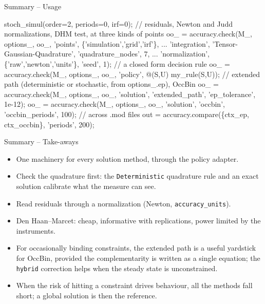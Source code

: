 \documentclass[11pt,aspectratio=169]{beamer}
\newcommand{\code}[1]{\texttt{#1}}
\begin{document}
\begin{frame}[fragile]{Summary -- Usage}

\begin{semiverbatim}\scriptsize
stoch_simul(order=2, periods=0, irf=0);
// residuals, Newton and Judd normalizations, DHM test, at three kinds of points
oo_ = accuracy.check(M_, options_, oo_, 'points', \{'simulation','grid','irf'\}, ...
                     'integration', 'Tensor-Gaussian-Quadrature', 'quadrature_nodes', 7, ...
                     'normalization', \{'raw','newton','units'\}, 'seed', 1);
// a closed form decision rule
oo_ = accuracy.check(M_, options_, oo_, 'policy', @(S,U) my_rule(S,U));
// extended path (deterministic or stochastic, from options_.ep), OccBin
oo_ = accuracy.check(M_, options_, oo_, 'solution', 'extended_path', 'ep_tolerance', 1e-12);
oo_ = accuracy.check(M_, options_, oo_, 'solution', 'occbin', 'occbin_periods', 100);
// across .mod files
out = accuracy.compare(\{ctx_ep, ctx_occbin\}, 'periods', 200);
\end{semiverbatim}

\end{frame}

\begin{frame}{Summary -- Take-aways}

\begin{itemize}

\item One machinery for every solution method, through the policy adapter.\newline

\item Check the quadrature first: the \code{Deterministic} quadrature rule and an exact solution calibrate what the measure can see.\newline

\item Read residuals through a normalization (Newton, \code{accuracy\_units}).\newline

\item Den Haan--Marcet: cheap, informative with replications, power limited by the instruments.\newline

\item For occasionally binding constraints, the extended path is a useful yardstick for OccBin, provided the complementarity is written as a single equation; the \code{hybrid} correction helps when the steady state is unconstrained.\newline

\item When the risk of hitting a constraint drives behaviour, all the methods fall short; a global solution is then the reference.

\end{itemize}

\end{frame}
\end{document}

